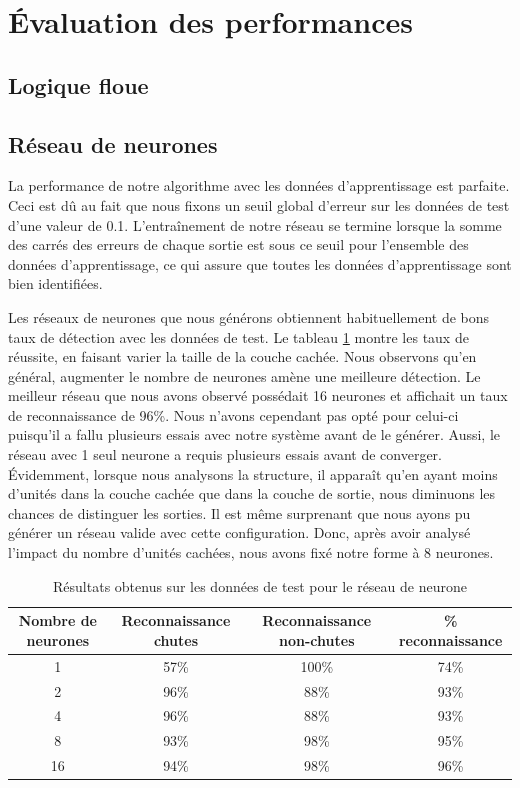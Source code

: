 \documentclass[12pt,letterpaper]{article}
\begin{document}
\section{Évaluation des performances}

\subsection{Logique floue}

\subsection{Réseau de neurones} %

La performance de notre algorithme avec les données d'apprentissage est parfaite. Ceci est dû au fait que nous fixons un seuil global d'erreur sur les données de test d'une valeur de 0.1. L'entraînement de notre réseau se termine lorsque la somme des carrés des erreurs de chaque sortie est sous ce seuil pour l'ensemble des données d'apprentissage, ce qui assure que toutes les données d'apprentissage sont bien identifiées.

Les réseaux de neurones que nous générons obtiennent habituellement de bons taux de détection avec les données de test. Le tableau \ref{tbl:neural_results} montre les taux de réussite, en faisant varier la taille de la couche cachée. Nous observons qu'en général, augmenter le nombre de neurones amène une meilleure détection. Le meilleur réseau que nous avons observé possédait 16 neurones et affichait un taux de reconnaissance de 96\%. Nous n'avons cependant pas opté pour celui-ci puisqu'il a fallu plusieurs essais avec notre système avant de le générer. Aussi, le réseau avec 1 seul neurone a requis plusieurs essais avant de converger. Évidemment, lorsque nous analysons la structure, il apparaît qu'en ayant moins d'unités dans la couche cachée que dans la couche de sortie, nous diminuons les chances de distinguer les sorties. Il est même surprenant que nous ayons pu générer un réseau valide avec cette configuration. Donc, après avoir analysé l'impact du nombre d'unités cachées, nous avons fixé notre forme à 8 neurones.
\begin{table}
\centering
\begin{tabular}{|c|c|c|c|}
    \hline
    Nombre de neurones & Reconnaissance chutes & Reconnaissance non-chutes & \% reconnaissance \\ \hline
    1 & 57\% & 100\% & 74\%  \\ \hline
    2 & 96\%  & 88\% & 93\% \\ \hline
    4 & 96\% & 88\% & 93\% \\ \hline
    8 & 93\% & 98\% & 95\% \\ \hline
    16 & 94\% & 98\% & 96\% \\ \hline
\end{tabular}
\caption{Résultats obtenus sur les données de test pour le réseau de neurone}
\label{tbl:neural_results}
\end{table}
\end{document}
